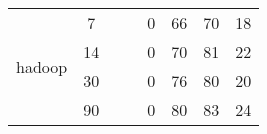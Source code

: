 \begin{wraptable}{r}{3.8in}
\begin{tabular}{c@{~}c|c@{~}c@{~}c|c@{~}c@{~}c}
\multirow{4}{*}{hadoop}                              & 7                                                    & \cellcolor[gray]{0.8}{0}         & \cellcolor[gray]{0.8}{0}       & 0       & 66         & 70       & 18      \\ \cline{2-2}
                              & 14                                                   & \cellcolor[gray]{0.8}{0}         & \cellcolor[gray]{0.8}{0}       & 0       & 70         & 81       & 22      \\ \cline{2-2}
                              & 30                                                   & \cellcolor[gray]{0.8}{0}         & \cellcolor[gray]{0.8}{0}       & 0       & 76         & 80       & 20      \\ \cline{2-2}
                              & 90                                                   & \cellcolor[gray]{0.8}{32}        & \cellcolor[gray]{0.8}{2}      & 0       & 80         & 83       & 24      \\ \hline

\end{tabular}
\end{wraptable}
